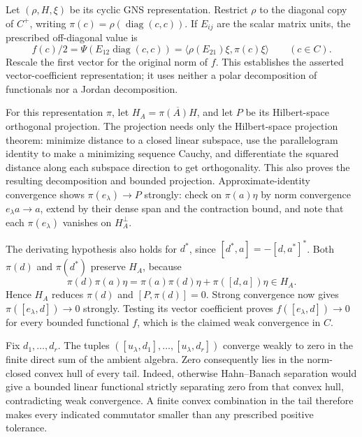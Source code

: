 \documentclass[
  11pt,
]{article}
\begin{document}
Let \((\rho,H,\xi)\) be its cyclic GNS representation. Restrict \(\rho\)
to the diagonal copy of \(C^+\), writing
\(\pi(c)=\rho(\operatorname{diag}(c,c))\). If \(E_{ij}\) are the scalar
matrix units, the prescribed off-diagonal value is \[
f(c)/2=\Psi(E_{12}\operatorname{diag}(c,c))
=\langle\rho(E_{21})\xi,\pi(c)\xi\rangle\qquad(c\in C).
\] Rescale the first vector for the original norm of \(f\). This
establishes the asserted vector-coefficient representation; it uses
neither a polar decomposition of functionals nor a Jordan decomposition.

For this representation \(\pi\), let \(H_A=\overline{\pi(A)H}\), and let
\(P\) be its Hilbert-space orthogonal projection. The projection needs
only the Hilbert-space projection theorem: minimize distance to a closed
linear subspace, use the parallelogram identity to make a minimizing
sequence Cauchy, and differentiate the squared distance along each
subspace direction to get orthogonality. This also proves the resulting
decomposition and bounded projection. Approximate-identity convergence
shows \(\pi(e_\lambda)\to P\) strongly: check on \(\pi(a)\eta\) by norm
convergence \(e_\lambda a\to a\), extend by their dense span and the
contraction bound, and note that each \(\pi(e_\lambda)\) vanishes on
\(H_A^\perp\).

The derivating hypothesis also holds for \(d^*\), since
\([d^*,a]=-[d,a^*]^*\). Both \(\pi(d)\) and \(\pi(d^*)\) preserve
\(H_A\), because \[
\pi(d)\pi(a)\eta
=\pi(a)\pi(d)\eta+\pi([d,a])\eta\in H_A.
\] Hence \(H_A\) reduces \(\pi(d)\) and \([P,\pi(d)]=0\). Strong
convergence now gives \(\pi([e_\lambda,d])\to0\) strongly. Testing its
vector coefficient proves \(f([e_\lambda,d])\to0\) for every bounded
functional \(f\), which is the claimed weak convergence in \(C\).

Fix \(d_1,\ldots,d_r\). The tuples
\(([u_\lambda,d_1],\ldots,[u_\lambda,d_r])\) converge weakly to zero in
the finite direct sum of the ambient algebra. Zero consequently lies in
the norm-closed convex hull of every tail. Indeed, otherwise
Hahn--Banach separation would give a bounded linear functional strictly
separating zero from that convex hull, contradicting weak convergence. A
finite convex combination in the tail therefore makes every indicated
commutator smaller than any prescribed positive tolerance.
\end{document}
